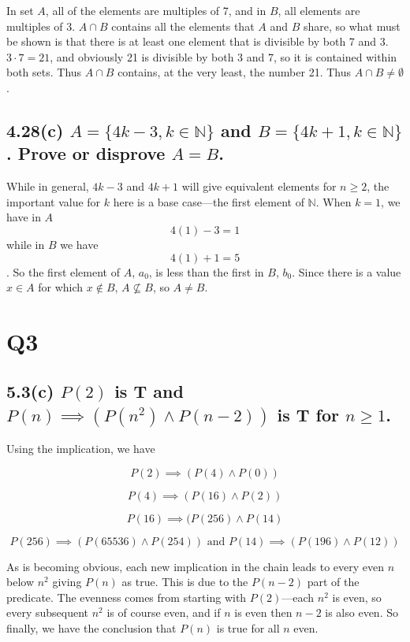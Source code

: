 \documentclass{article}
\begin{document}
In set $A$, all of the elements are multiples of 7, and in $B$, all elements are multiples of 3. $A \cap B$ contains all the elements that $A$ and $B$ share, so what must be shown is that there is at least one element that is divisible by both 7 and 3. $3 \cdot 7 = 21$, and obviously 21 is divisible by both 3 and 7, so it is contained within both sets. Thus $A\cap B$ contains, at the very least, the number 21. Thus $A\cap B \neq \emptyset$.

\subsection*{4.28(c) \normalsize $A = \{4k-3, k \in \mathbb{N}\}$ and $B = \{4k + 1, k \in \mathbb{N} \}$. Prove or disprove $A = B$.}

While in general, $4k -3$ and $4k + 1$ will give equivalent elements for $n \geq 2$, the important value for $k$ here is a base case---the first element of $\mathbb{N}$. When $k = 1$, we have in $A$ $$4(1) - 3 = 1$$ while in $B$ we have $$4(1) + 1 = 5$$. So the first element of $A$, $a_0$, is less than the first in $B$, $b_0$. Since there is a value $x \in A$ for which $x \notin B$, $A \not\subseteq B$, so $A \neq B$. 

\section*{Q3}
\subsection*{5.3(c) \normalsize $P(2)$ is \textbf{T} and $P(n) \implies (P(n^2) \wedge P(n-2))$ is \textbf{T} for $n \geq 1$.}

Using the implication, we have

$$P(2) \implies (P(4) \wedge P(0))$$

$$P(4) \implies (P(16) \wedge P(2))$$

$$P(16) \implies (P(256) \wedge P(14)$$

$$P(256) \implies (P(65536) \wedge P(254)) \text{ and } P(14) \implies (P(196) \wedge P(12))$$

As is becoming obvious, each new implication in the chain leads to every even $n$ below $n^2$ giving $P(n)$ as true. This is due to the $P(n-2)$ part of the predicate. The evenness comes from starting with $P(2)$---each $n^2$ is even, so every subsequent $n^2$ is of course even, and if $n$ is even then $n-2$ is also even. So finally, we have the conclusion that $P(n)$ is true for all $n$ even.
\end{document}
